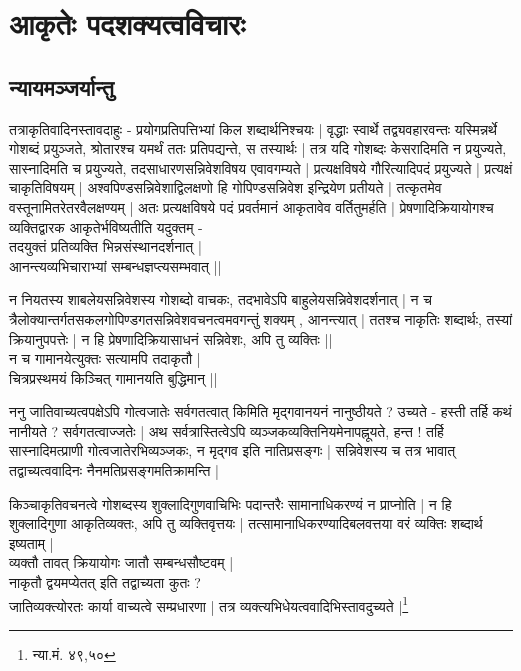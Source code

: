 \chapter{आकृतेः पदशक्यत्वविचारः}

\section{न्यायमञ्जर्यान्तु} तत्राकृतिवादिनस्तावदाहुः - प्रयोगप्रतिपत्तिभ्यां किल शब्दार्थनिश्चयः | वृद्धाः स्वार्थे तद्व्यवहारवन्तः यस्मिन्नर्थे गोशब्दं प्रयुञ्जते, श्रोतारश्च यमर्थं ततः प्रतिपद्यन्ते, स तस्यार्थः | तत्र यदि गोशब्दः केसरादिमति न प्रयुज्यते, सास्नादिमति च प्रयुज्यते, तदसाधारणसन्निवेशविषय एवावगम्यते | प्रत्यक्षविषये गौरित्यादिपदं प्रयुज्यते | प्रत्यक्षं चाकृतिविषयम् | अश्वपिण्डसन्निवेशाद्विलक्षणो हि गोपिण्डसन्निवेश इन्द्रियेण प्रतीयते | तत्कृतमेव वस्तूनामितरेतरवैलक्षण्यम् | अतः प्रत्यक्षविषये पदं प्रवर्तमानं आकृतावेव वर्तितुमर्हति | प्रेषणादिक्रियायोगश्च व्यक्तिद्वारक आकृतेर्भविष्यतीति यदुक्तम् -\\ तदयुक्तं प्रतिव्यक्ति भिन्नसंस्थानदर्शनात् |\\ आनन्त्यव्यभिचाराभ्यां सम्बन्धज्ञप्त्यसम्भवात् ||

न नियतस्य शाबलेयसन्निवेशस्य गोशब्दो वाचकः, तदभावेऽपि बाहुलेयसन्निवेशदर्शनात् | न च त्रैलोक्यान्तर्गतसकलगोपिण्डगतसन्निवेशवचनत्वमवगन्तुं शक्यम् , आनन्त्यात् | ततश्च नाकृतिः शब्दार्थः, तस्यां क्रियानुपपत्तेः | न हि प्रेषणादिक्रियासाधनं सन्निवेशः, अपि तु व्यक्तिः ||\\ न च गामानयेत्युक्तः सत्यामपि तदाकृतौ |\\ चित्रप्रस्थमयं किञ्चित् गामानयति बुद्धिमान् ||

ननु जातिवाच्यत्वपक्षेऽपि गोत्वजातेः सर्वगतत्वात् किमिति मृद्गवानयनं नानुष्ठीयते ? उच्यते - हस्ती तर्हि कथं नानीयते ? सर्वगतत्वाज्जतेः | अथ सर्वत्रास्तित्वेऽपि व्यञ्जकव्यक्तिनियमेनापह्नूयते, हन्त ! तर्हि सास्नादिमत्प्राणी गोत्वजातेरभिव्यञ्जकः, न मृद्गव इति नातिप्रसङ्गः | सन्निवेशस्य च तत्र भावात् तद्वाच्यत्ववादिनः नैनमतिप्रसङ्गमतिक्रामन्ति | 

किञ्चाकृतिवचनत्वे गोशब्दस्य शुक्लादिगुणवाचिभिः पदान्तरैः सामानाधिकरण्यं न प्राप्नोति | न हि शुक्लादिगुणा आकृतिव्यक्तः, अपि तु व्यक्तिवृत्तयः | तत्सामानाधिकरण्यादिबलवत्तया वरं व्यक्तिः शब्दार्थ इष्यताम् |\\ व्यक्तौ तावत् क्रियायोगः जातौ सम्बन्धसौष्टवम् |\\ नाकृतौ द्वयमप्येतत् इति तद्वाच्यता कुतः ?\\ जातिव्यक्त्योरतः कार्या वाच्यत्वे सम्प्रधारणा | तत्र व्यक्त्यभिधेयत्ववादिभिस्तावदुच्यते |\footnote{न्या.मं. ४९,५०}









